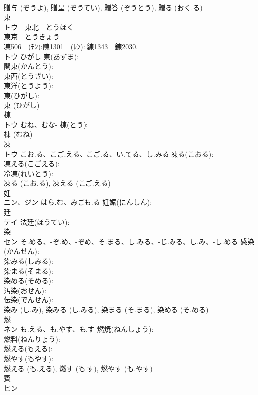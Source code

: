 \documentclass[8pt]{extreport}
\begin{document}
\begin{CJK}{UTF8}{min}
\\	贈与 (ぞうよ), 贈呈 (ぞうてい), 贈答 (ぞうとう), 贈る (おく.る)
\\	東		
\\	トウ　東北　とうほく 
\\	東京　とうきょう
\\	凍506　(ﾁﾝ):陳1301　(ﾚﾝ): 練1343　錬2030.	
\\	トウ	ひがし	東(あずま): 
\\	関東(かんとう): 
\\	東西(とうざい): 
\\	東洋(とうよう): 
\\	東(ひがし): 
\\	東 (ひがし)
\\	棟			
\\	トウ	むね、むな-	棟(とう): 
\\	棟 (むね)
\\	凍			
\\	トウ	こお.る、こご.える、こご.る、い.てる、し.みる	凍る(こおる): 
\\	凍える(こごえる): 
\\	冷凍(れいとう): 
\\	凍る (こお.る), 凍える (こご.える)
\\	妊			
\\	ニン、ジン	はら.む、みごも.る	妊娠(にんしん): 
\\	廷			
\\	テイ		法廷(ほうてい): 
\\	染		
\\	セン	そ.める、-ぞ.め、-ぞめ、そ.まる、し.みる、-じ.みる、し.み、-し.める	感染(かんせん): 
\\	染みる(しみる): 
\\	染まる(そまる): 
\\	染める(そめる): 
\\	汚染(おせん): 
\\	伝染(でんせん): 
\\	染み (し.み), 染みる (し.みる), 染まる (そ.まる), 染める (そ.める)
\\	燃		
\\	ネン	も.える、も.やす、も.す	燃焼(ねんしょう): 
\\	燃料(ねんりょう): 
\\	燃える(もえる): 
\\	燃やす(もやす): 
\\	燃える (も.える), 燃す (も.す), 燃やす (も.やす)
\\	賓		
\\	ヒン			

\end{CJK}
\end{document}
